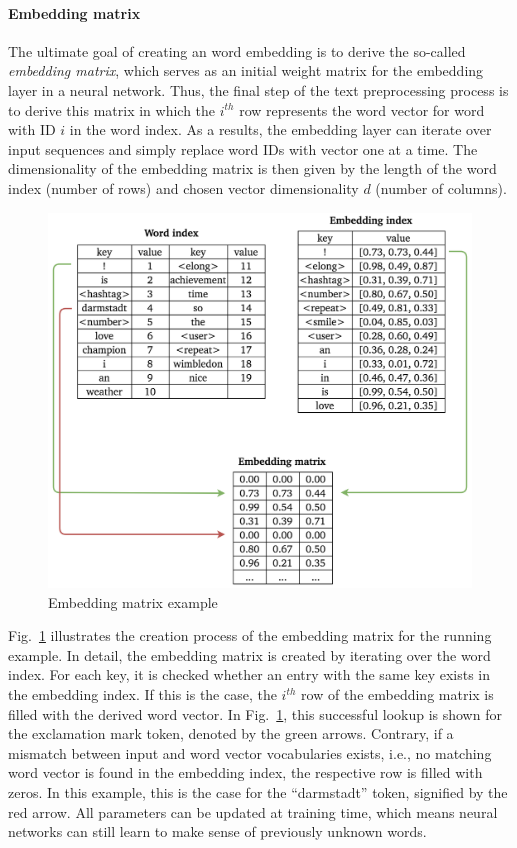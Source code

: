 \paragraph{Embedding matrix}
\label{sub:embedding_matrix}

The ultimate goal of creating an word embedding is to derive the so-called
\textit{embedding matrix}, which serves as an initial weight matrix for the
embedding layer in a neural network.
Thus, the final step of the text preprocessing process is to derive this
matrix in which the $i^{th}$ row represents the word vector for word with ID $i$
in the word index.
As a results, the embedding layer can iterate over input sequences and simply
replace word IDs with vector one at a time.
The dimensionality of the embedding matrix is then given by the length of the
word index (number of rows) and chosen vector dimensionality $d$ (number of columns).

\begin{figure}[h]
  \includegraphics[width=\textwidth]{img/text_preprocessing_5}
  \caption{Embedding matrix example}
\label{fig:embedding_matrix}
\end{figure}

Fig.~\ref{fig:embedding_matrix} illustrates the creation process of the embedding
matrix for the running example.
In detail, the embedding matrix is created by iterating over the word index.
For each key, it is checked whether an entry with the same key exists in the
embedding index.
If this is the case, the $i^{th}$ row of the embedding matrix is filled with
the derived word vector.
In Fig.~\ref{fig:embedding_matrix}, this successful lookup is shown for the
exclamation mark token, denoted by the green arrows.
Contrary, if a mismatch between input and word vector vocabularies exists, i.e.,
no matching word vector is found in the embedding index, the respective row
is filled with zeros.
In this example, this is the case for the ``darmstadt'' token, signified by the
red arrow.
All parameters can be updated at training time, which means neural networks
can still learn to make sense of previously unknown words.

